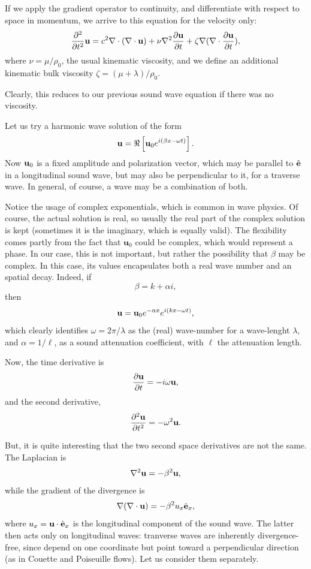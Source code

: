 If we apply the gradient operator to continuity, and differentiate
with respect to space in momentum, we arrive to this equation for
the velocity only:
\begin{equation}
  \label{eq:sound_att_Fourier}
  \frac{\partial^2 }{\partial t^2 } \mathbf{u} =
  c^2\nabla \cdot (\nabla\cdot\mathbf{u}) + \nu \nabla^2\frac{\partial\mathbf{u}}{\partial t} +
  \zeta \nabla (\nabla\cdot \frac{\partial\mathbf{u}}{\partial t} ) ,
\end{equation}
where $\nu=\mu/\rho_0$, the usual kinematic viscosity, and we define
an additional kinematic bulk viscosity $\zeta=(\mu+\lambda)/\rho_0$.

Clearly, this reduces to our previous sound wave equation if there was
no viscosity.

Let us try a harmonic wave solution of the form
\begin{equation}
  \label{eq:wave_form_visc}
  \mathbf{u} = \Re\left[ \mathbf{u}_0 e^{i( \beta x - \omega t)} \right].
\end{equation}
Now $\mathbf{u}_0$ is a fixed amplitude and polarization vector, which may
be parallel to $\hat{\mathbf{e}}$ in a longitudinal sound wave, but may also be
perpendicular to it, for a traverse wave. In general, of course, a
wave may be a combination of both.

Notice the usage of complex exponentials, which is common in wave
physics. Of course, the actual solution is real, so usually the real
part of the complex solution is kept (sometimes it is the imaginary,
which is equally valid). The flexibility comes partly from the fact
that $\mathbf{u}_0$ could be complex, which would represent a phase.
In our case, this is not important, but rather the possibility that
$\beta$ may be complex. In this case, its values encapsulates both a
real wave number and an spatial decay. Indeed, if
\[
  \beta = k + \alpha i ,
\]
then
\[
  \mathbf{u} = \mathbf{u}_0e^{- \alpha x} e^{i(k x - \omega t )} ,
\]
which clearly identifies $ \omega=2\pi /\lambda$ as the (real)
wave-number for a wave-lenght $ \lambda$, and $ \alpha=1 /\ell $, as a
sound attenuation coefficient, with $ \ell $ the attenuation length.

Now, the time derivative is
\[
  \frac{\partial \mathbf{u}  }{\partial t }  = -i \omega \mathbf{u} ,
\]
and the second derivative,
\[
  \frac{\partial^2 \mathbf{u}   }{\partial t^2 }  = -\omega^2 \mathbf{u}.
\]

But, it is quite interesting that the two second space derivatives are
not the same. The Laplacian is
\[
\nabla^2 \mathbf{u} = -\beta^2 \mathbf{u},
\]
while the gradient of the divergence is
\[
\nabla (\nabla\cdot \mathbf{u} ) = -\beta^2 u_x \hat{\mathbf{e}}_x,
\]
where $u_x= \mathbf{u}\cdot \hat{\mathbf{e}}_x$ is the longitudinal component of the
sound wave.
%
The latter then acts only on longitudinal waves: tranverse waves are
inherently divergence-free, since depend on one coordinate but point
toward a perpendicular direction (as in Couette and Poiseuille flows).
Let us consider them separately.

